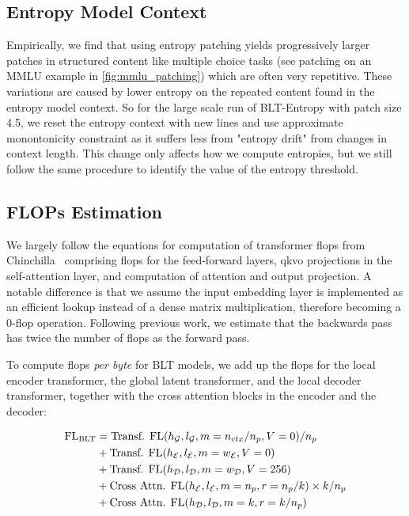 \subsection{Entropy Model Context}
\label{section:entropy-context}
Empirically, we find that using entropy patching yields progressively larger patches in structured content like multiple choice tasks (see patching on an MMLU example in \autoref{fig:mmlu_patching}) which are often very repetitive. These variations are caused by lower entropy on the repeated content found in the entropy model context. So for the large scale run of {\textsc BLT}-Entropy with patch size 4.5, we reset the entropy context with new lines and use approximate monontonicity constraint as it suffers less from "entropy drift" from changes in context length. This change only affects how we compute entropies, but we still follow the same procedure to identify the value of the entropy threshold.

\subsection{FLOPs Estimation} 
\label{section:flops}

We largely follow the equations for computation of transformer flops from Chinchilla~\citep{hoffmann2022training} comprising flops for the feed-forward layers, qkvo projections in the self-attention layer, and computation of attention and output projection. A notable difference is that we assume the input embedding layer is implemented as an efficient lookup instead of a dense matrix multiplication, therefore becoming a 0-flop operation. Following previous work, we estimate that the backwards pass has twice the number of flops as the forward pass.

To compute flops \textit{per byte} for {\textsc BLT} models, we add up the flops for the local encoder transformer, the global latent transformer, and the local decoder transformer, together with the cross attention blocks in the encoder and the decoder:

\begin{align}
    \text{FL}_{\text{{\textsc BLT}}} &= \text{Transf. FL}(h_{\mathcal{G}}, l_{\mathcal{G}}, m=n_{ctx}/n_p,V=0) / n_p\\
   &+\text{Transf. FL}(h_{\mathcal{E}}, l_{\mathcal{E}}, m=w_{\mathcal{E}}, V=0) \\
   &+ \text{Transf. FL}(h_{\mathcal{D}}, l_{\mathcal{D}}, m=w_{\mathcal{D}}, V=256) \\ 
    &+ \text{Cross Attn. FL}(h_{\mathcal{E}}, l_{\mathcal{E}}, m=n_p, r=n_p/k) \times k/n_p \\ 
   &+ \text{Cross Attn. FL}(h_{\mathcal{D}}, l_{\mathcal{D}}, m=k, r=k/n_p) 
\end{align}

